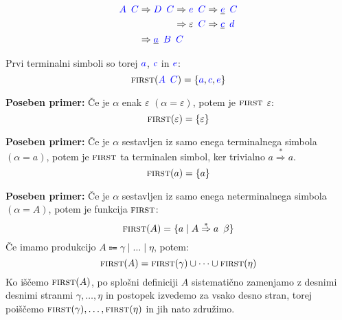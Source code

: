 \documentclass{article}
\newcommand{\Special}[1]{\textbf{#1}}
\newcommand{\FIRST}{\textsc{first}}
\newcommand{\Symbol}[1]{\textcolor{blue}{#1}}
\newcommand{\Null}{\varepsilon}
\newcommand{\Arrow}{\Coloneq}
\newcommand{\Derive}{\Rightarrow}
\newcommand{\DeriveStar}{\overset{\ast}{\Rightarrow}}
\newcommand{\Seq}{{\ \,}}
\newcommand{\Union}{\mathrel{|}}
\begin{document}
\begin{equation*}
  \Symbol{A} \Seq \Symbol{C} \begin{aligned}[t]
    &\Derive \Symbol{D} \Seq \Symbol{C} \begin{aligned}[t]
      &\Derive \Symbol{e} \Seq \Symbol{C} \Derive \underline{\Symbol{e}} \Seq \Symbol{C} \\
      &\Derive \Null \Seq \Symbol{C} \Derive \underline{\Symbol{c}} \Seq \Symbol{d} \\
    \end{aligned}\\
    &\Derive \underline{\Symbol{a}} \Seq \Symbol{B} \Seq \Symbol{C}
  \end{aligned}
\end{equation*}

Prvi terminalni simboli so torej $\Symbol{a}$, $\Symbol{c}$ in $\Symbol{e}$:
\begin{equation*}
  \FIRST(\Symbol{A} \Seq \Symbol{C}) = \{\Symbol{a}, \Symbol{c}, \Symbol{e}\}
\end{equation*}

\Special{Poseben primer:} Če je $\alpha$ enak $\Null$ ${(\alpha = \Null)}$, potem je $\FIRST$ $\Null$:
\begin{equation*}
  \FIRST(\Null) = \{ \Null \}
\end{equation*}

\Special{Poseben primer:} Če je $\alpha$ sestavljen iz samo enega terminalnega simbola ${(\alpha = a)}$, potem je $\FIRST$ ta terminalen simbol, ker trivialno $a \DeriveStar a$.
\begin{equation*}
  \FIRST(a) = \{ a \}
\end{equation*}

\Special{Poseben primer:} Če je $\alpha$ sestavljen iz samo enega neterminalnega simbola ${(\alpha = A)}$, potem je funkcija $\FIRST$:
\begin{equation*}
  \FIRST(A) = \{ a \mid A \DeriveStar a \Seq \beta \}
\end{equation*}
Če imamo produkcijo $A \Arrow \gamma \Union \dots \Union \eta$, potem:
\begin{equation*}
  \FIRST(A) = \FIRST(\gamma) \cup \dots \cup \FIRST(\eta)
\end{equation*}
Ko iščemo $\FIRST(A)$, po splošni definiciji $A$ sistematično zamenjamo z desnimi desnimi stranmi $\gamma, \dots, \eta$ in postopek izvedemo za vsako desno stran, torej poiščemo $\FIRST(\gamma), \dots, \FIRST(\eta)$ in jih nato združimo.
\end{document}
